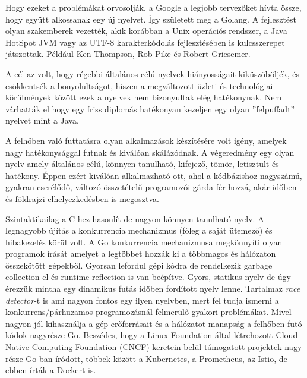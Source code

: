 Hogy ezeket a problémákat orvosolják, a Google a legjobb tervezőket hívta össze, hogy együtt alkossanak egy új nyelvet.
Így született meg a Golang.
A fejlesztést olyan szakemberek vezették, akik korábban a Unix operációs rendszer, a Java HotSpot JVM
vagy az UTF-8 karakterkódolás fejlesztésében is kulcsszerepet játszottak.
Például Ken Thompson, Rob Pike és Robert Griesemer.

A cél az volt, hogy régebbi általános célú nyelvek hiányosságait kiküszöböljék, és csökkentsék a bonyolultságot,
hiszen a megváltozott üzleti és technológiai körülmények között ezek a nyelvek nem bizonyultak elég hatékonynak.
Nem várhatták el hogy egy friss diplomás hatékonyan kezeljen egy olyan ''felpuffadt'' nyelvet mint a Java.

A felhőben való futtatásra olyan alkalmazások készítésére volt igény, amelyek nagy hatékonysággal futnak és kiválóan skálázódnak.
A végeredmény egy olyan nyelv amely általános célú, könnyen tanulható, kifejező, tömör, letisztult és hatékony.
Éppen ezért kiválóan alkalmazható ott, ahol a kódbázishoz nagyszámú, gyakran cserélődő, változó összetételű programozói gárda fér hozzá,
akár időben és földrajzi elhelyezkedésben is megosztva.

Szintaktikailag a C-hez hasonlít de nagyon könnyen tanulható nyelv.
A legnagyobb újítás a konkurrencia mechanizmus (főleg a saját ütemező) és hibakezelés körül volt.
A Go konkurrencia mechanizmusa megkönnyíti olyan programok írását amelyet a legtöbbet hozzák ki a többmagos és hálózaton összekötött gépekből.
Gyorsan lefordul gépi kódra de rendelkezik garbage collection-el és runtime reflection is van beépítve.
Gyors, statikus nyelv de úgy érezzük mintha egy dinamikus futás időben fordított nyelv lenne.
Tartalmaz \textit{race detector}-t is ami nagyon fontos egy ilyen nyelvben, mert fel tudja ismerni a konkurrens/párhuzamos programozásnál felmerülő gyakori problémákat.
Mivel nagyon jól kihasználja a gép erőforrásait és a hálózatot manapság a felhőben futó kódok nagyrésze Go.
Beszédes, hogy a Linux Foundation által létrehozott Cloud Native Computing Foundation (CNCF) keretein
belül támogatott projektek nagy része Go-ban íródott, többek között a Kubernetes, a Prometheus, az Istio, de ebben írták a Dockert is.


